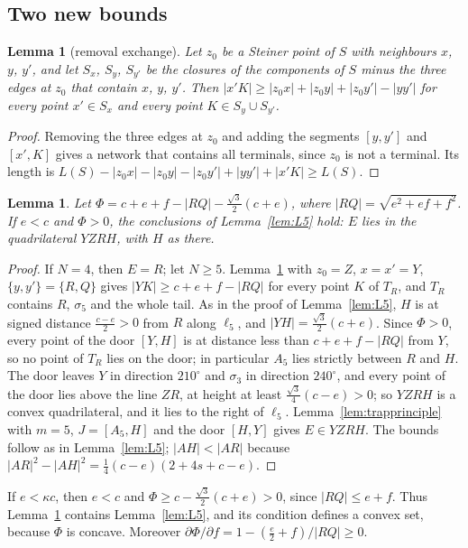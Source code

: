 \documentclass[11pt]{amsart}
\newtheorem{lemma}[theorem]{Lemma}
\theoremstyle{definition}
\theoremstyle{remark}
\numberwithin{equation}{section}
\begin{document}
\subsection{Two new bounds}

\begin{lemma}[removal exchange]\label{lem:removal}
Let $z_0$ be a Steiner point of $S$ with neighbours $x$, $y$, $y'$, and let $S_x$, $S_y$, $S_{y'}$ be the closures of the components of $S$ minus the three edges at $z_0$ that contain $x$, $y$, $y'$. Then $|x'K|\ge|z_0x|+|z_0y|+|z_0y'|-|yy'|$ for every point $x'\in S_x$ and every point $K\in S_y\cup S_{y'}$.
\end{lemma}

\begin{proof}
Removing the three edges at $z_0$ and adding the segments $[y,y']$ and $[x',K]$ gives a network that contains all terminals, since $z_0$ is not a terminal. Its length is $L(S)-|z_0x|-|z_0y|-|z_0y'|+|yy'|+|x'K|\ge L(S)$.
\end{proof}

\begin{lemma}\label{lem:x2}
Let $\Phi=c+e+f-|RQ|-\frac{\sqrt3}2(c+e)$, where $|RQ|=\sqrt{e^2+ef+f^2}$. If $e<c$ and $\Phi>0$, the conclusions of Lemma~\ref{lem:L5} hold: $E$ lies in the quadrilateral $YZRH$, with $H$ as there.
\end{lemma}

\begin{proof}
If $N=4$, then $E=R$; let $N\ge5$. Lemma~\ref{lem:removal} with $z_0=Z$, $x=x'=Y$, $\{y,y'\}=\{R,Q\}$ gives $|YK|\ge c+e+f-|RQ|$ for every point $K$ of $T_R$, and $T_R$ contains $R$, $\sigma_5$ and the whole tail. As in the proof of Lemma~\ref{lem:L5}, $H$ is at signed distance $\frac{c-e}2>0$ from $R$ along $\ell_5$, and $|YH|=\frac{\sqrt3}2(c+e)$. Since $\Phi>0$, every point of the door $[Y,H]$ is at distance less than $c+e+f-|RQ|$ from $Y$, so no point of $T_R$ lies on the door; in particular $A_5$ lies strictly between $R$ and $H$. The door leaves $Y$ in direction $210^\circ$ and $\sigma_3$ in direction $240^\circ$, and every point of the door lies above the line $ZR$, at height at least $\frac{\sqrt3}4(c-e)>0$; so $YZRH$ is a convex quadrilateral, and it lies to the right of $\ell_5$. Lemma~\ref{lem:trapprinciple} with $m=5$, $J=[A_5,H]$ and the door $[H,Y]$ gives $E\in YZRH$. The bounds follow as in Lemma~\ref{lem:L5}; $|AH|<|AR|$ because $|AR|^2-|AH|^2=\frac14(c-e)(2+4s+c-e)$.
\end{proof}

If $e<\kappa c$, then $e<c$ and $\Phi\ge c-\frac{\sqrt3}2(c+e)>0$, since $|RQ|\le e+f$. Thus Lemma~\ref{lem:x2} contains Lemma~\ref{lem:L5}, and its condition defines a convex set, because $\Phi$ is concave. Moreover $\partial\Phi/\partial f=1-(\frac e2+f)/|RQ|\ge0$.
\end{document}

